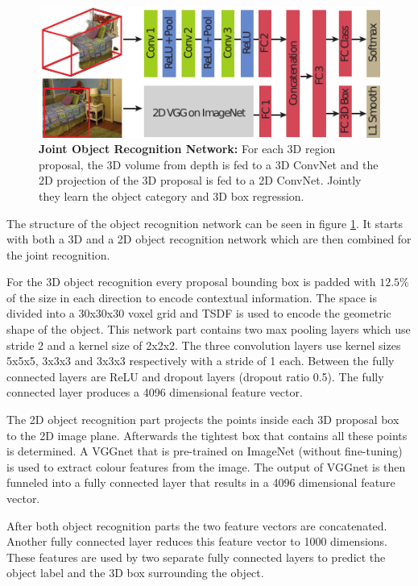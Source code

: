 \documentclass[12pt]{scrartcl}
\begin{document}
\begin{figure}
    \centering
    \includegraphics{orn-system-drawing}
    \caption{\textbf{Joint Object Recognition Network:} For each 3D region proposal,
    the 3D volume from depth is fed to a 3D ConvNet and the 2D projection of the
    3D proposal is fed to a 2D ConvNet. Jointly they learn the object category
    and 3D box regression.}
    \label{fig:system}
\end{figure}

The structure of the object recognition network can be seen in figure \ref{fig:system}.
It starts with both a 3D and a 2D object recognition network which are then combined
for the joint recognition.

For the 3D object recognition every proposal bounding box is padded with \(12.5\%\)
of the size in each direction to encode contextual information. The space is divided
into a 30x30x30 voxel grid and TSDF is used to encode the geometric shape of
the object. This network part contains two max pooling layers which use stride 2
and a kernel size of 2x2x2. The three convolution layers use kernel sizes
5x5x5, 3x3x3 and 3x3x3 respectively with a stride of 1 each. Between the fully connected
layers are ReLU and dropout layers (dropout ratio 0.5). The fully connected
layer produces a 4096 dimensional feature vector.

The 2D object recognition part projects the points inside each 3D proposal box
to the 2D image plane. Afterwards the tightest box that contains all these points
is determined. A VGGnet that is pre-trained on ImageNet (without fine-tuning)
is used to extract colour features from the image. The output of VGGnet is then
funneled into a fully connected layer that results in a 4096 dimensional feature
vector.

After both object recognition parts the two feature vectors are concatenated.
Another fully connected layer reduces this feature vector to 1000 dimensions.
These features are used by two separate fully connected layers to predict the
object label and the 3D box surrounding the object.
\end{document}
